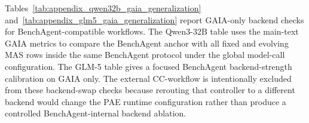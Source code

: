\begin{table}[t]
    \centering
    \caption{Auxiliary controller calibration against a standalone vanilla ReAct controller under aligned BenchAgent tool regimes. MATH, BBH, and HumanEval use the \texttt{python\_interpreter}-only regime, whereas HotpotQA uses the expanded full-tool regime. All rows use the same GPT-4.1 backend and evaluator pipeline as the corresponding BenchAgent anchor.}
    \label{tab:appendix_react_calibration}
    \footnotesize
    \setlength{\tabcolsep}{5pt}
    \renewcommand{\arraystretch}{1.08}
\end{table}

Tables~\ref{tab:appendix_qwen32b_gaia_generalization} and~\ref{tab:appendix_glm5_gaia_generalization} report GAIA-only backend checks for BenchAgent-compatible workflows. The Qwen3-32B table uses the main-text GAIA metrics to compare the BenchAgent anchor with all fixed and evolving MAS rows inside the same BenchAgent protocol under the global model-call configuration. The GLM-5 table gives a focused BenchAgent backend-strength calibration on GAIA only. The external CC-workflow is intentionally excluded from these backend-swap checks because rerouting that controller to a different backend would change the PAE runtime configuration rather than produce a controlled BenchAgent-internal backend ablation.

